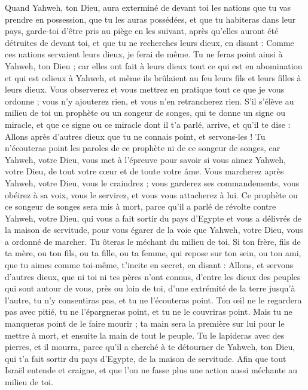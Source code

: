 \begin{multicols}{2}
Quand Yahweh, ton Dieu, aura exterminé de devant toi les nations que tu vas prendre en possession, que tu les auras possédées, et que tu habiteras dans leur pays,
garde-toi d’être pris au piège en les suivant, après qu’elles auront été détruites de devant toi, et que tu ne recherches leurs dieux, en disant : Comme ces nations servaient leurs dieux, je ferai de même.
Tu ne feras point ainsi à Yahweh, ton Dieu ; car elles ont fait à leurs dieux tout ce qui est en abomination et qui est odieux à Yahweh, et même ils brûlaient au feu leurs fils et leurs filles à leurs dieux.
Vous observerez et vous mettrez en pratique tout ce que je vous ordonne ; vous n'y ajouterez rien, et vous n'en retrancherez rien.
\VerseOne{}S'il s'élève au milieu de toi un prophète ou un songeur de songes, qui te donne un signe ou miracle,
et que ce signe ou ce miracle dont il t’a parlé, arrive, et qu’il te dise : Allons après d'autres dieux que tu ne connais point, et servons-les !
Tu n'écouteras point les paroles de ce prophète ni de ce songeur de songes, car Yahweh, votre Dieu, vous met à l’épreuve pour savoir si vous aimez Yahweh, votre Dieu, de tout votre cœur et de toute votre âme.
Vous marcherez après Yahweh, votre Dieu, vous le craindrez ; vous garderez ses commandements, vous obéirez à sa voix, vous le servirez, et vous vous attacherez à lui.
Ce prophète ou ce songeur de songes sera mis à mort, parce qu'il a parlé de révolte\FTNT{} contre Yahweh, votre Dieu, qui vous a fait sortir du pays d'Egypte et vous a délivrés de la maison de servitude, pour vous égarer de la voie que Yahweh, votre Dieu, vous a ordonné de marcher. Tu ôteras le méchant du milieu de toi.
Si ton frère, fils de ta mère, ou ton fils, ou ta fille, ou ta femme, qui repose sur ton sein, ou ton ami, que tu aimes comme toi-même, t'incite en secret, en disant : Allons, et servons d'autres dieux, que ni toi ni tes pères n’ont connus,
d'entre les dieux des peuples qui sont autour de vous, près ou loin de toi, d’une extrémité de la terre jusqu'à l'autre,
tu n’y consentiras pas, et tu ne l'écouteras point. Ton œil ne le regardera pas avec pitié, tu ne l’épargneras point, et tu ne le couvriras point.
Mais tu ne manqueras point de le faire mourir ; ta main sera la première sur lui pour le mettre à mort, et ensuite la main de tout le peuple.
Tu le lapideras avec des pierres, et il mourra, parce qu'il a cherché à te détourner de Yahweh, ton Dieu, qui t'a fait sortir du pays d'Egypte, de la maison de servitude.
Afin que tout Israël entende et craigne, et que l'on ne fasse plus une action aussi méchante au milieu de toi.

\end{multicols}
